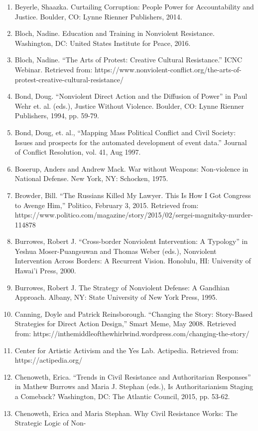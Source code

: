 \documentclass[twoside,a4paper,12pt,fleqn,openany]{extbook}
\begin{document}
\begin{enumerate}
\item Beyerle, Shaazka. Curtailing Corruption: People Power for Accountability and Justice. Boulder, CO: Lynne Rienner Publishers, 2014.
\item Bloch, Nadine. Education and Training in Nonviolent Resistance. Washington, DC: United States Institute for Peace, 2016.
\item Bloch, Nadine. “The Arts of Protest: Creative Cultural Resistance.” ICNC Webinar. Retrieved from: https://www.nonviolent-conflict.org/the-arts-of-protest-creative-cultural-resistance/
\item Bond, Doug. “Nonviolent Direct Action and the Diffusion of Power” in Paul Wehr et. al. (eds.), Justice Without Violence. Boulder, CO: Lynne Rienner Publishers, 1994, pp. 59-79.
\item Bond, Doug, et. al., “Mapping Mass Political Conflict and Civil Society: Issues and prospects for the automated development of event data.” Journal of Conflict Resolution, vol. 41, Aug 1997.
\item Boserup, Anders and Andrew Mack. War without Weapons: Non-violence in National Defense. New York, NY: Schocken, 1975.
\item Browder, Bill. “The Russians Killed My Lawyer. This Is How I Got Congress to Avenge Him,” Politico, February 3, 2015. Retrieved from: https://www.politico.com/magazine/story/2015/02/sergei-magnitsky-murder-114878
\item Burrowes, Robert J. “Cross-border Nonviolent Intervention: A Typology” in Yeshua Moser-Puangsuwan and Thomas Weber (eds.), Nonviolent Intervention Across Borders: A Recurrent Vision. Honolulu, HI: University of Hawai’i Press, 2000.
\item Burrowes, Robert J. The Strategy of Nonviolent Defense: A Gandhian Approach. Albany, NY: State University of New York Press, 1995.
\item Canning, Doyle and Patrick Reinsborough. “Changing the Story: Story-Based Strategies for
Direct Action Design,” Smart Meme, May 2008. Retrieved from: https://inthemiddleofthewhirlwind.wordpress.com/changing-the-story/
\item Center for Artistic Activism and the Yes Lab. Actipedia. Retrieved from: https://actipedia.org/
\item Chenoweth, Erica. “Trends in Civil Resistance and Authoritarian Responses” in Mathew Burrows and Maria J. Stephan (eds.), Is Authoritarianism Staging a Comeback? Washington, DC:
The Atlantic Council, 2015, pp. 53-62.
\item Chenoweth, Erica and Maria Stephan. Why Civil Resistance Works: The Strategic Logic of Non-

\end{enumerate}
\end{document}
